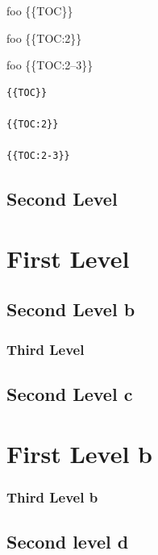 
\def\mytitle{Table of Contents}


\tableofcontents

\setcounter{tocdepth}{0}
\tableofcontents

\setcounter{tocdepth}{1}
\tableofcontents

foo \{\{TOC\}\}

foo \{\{TOC:2\}\}

foo \{\{TOC:2--3\}\}

\begin{verbatim}
{{TOC}}

{{TOC:2}}

{{TOC:2-3}}
\end{verbatim}

\chapter{Second Level}
\label{secondlevel}

\tableofcontents

\part{First Level}
\label{firstlevel}

\chapter{Second Level b}
\label{secondlevelb}

\section{Third Level}
\label{thirdlevel}

\chapter{Second Level c}
\label{secondlevelc}

\part{First Level b}
\label{firstlevelb}

\section{Third Level b}
\label{thirdlevelb}

\chapter{Second level d}
\label{secondleveld}

